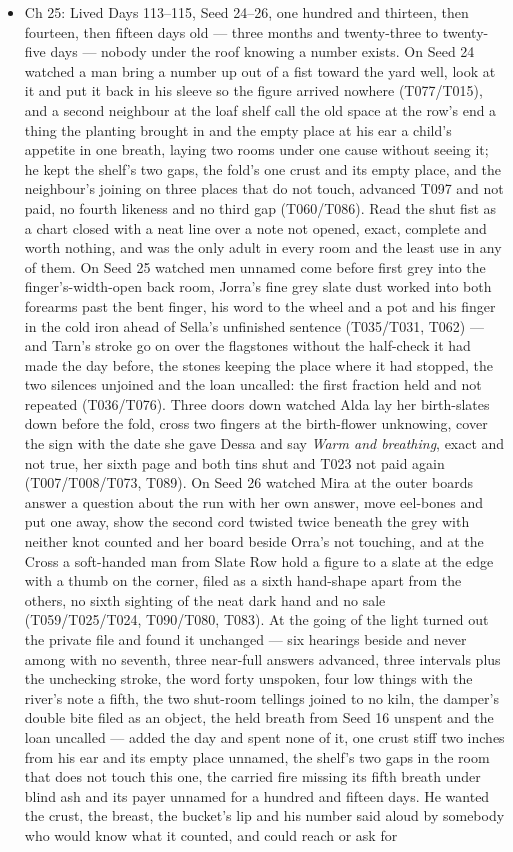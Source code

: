 \documentclass{design/chronicle}
\begin{document}
{\begin{itemize}[leftmargin=1.4em,itemsep=1pt,topsep=3pt,parsep=0pt]
\item Ch 25: Lived Days 113–115, Seed 24–26, one hundred and thirteen, then fourteen, then fifteen days old — three months and twenty-three to twenty-five days — nobody under the roof knowing a number exists. On Seed 24 watched a man bring a number up out of a fist toward the yard well, look at it and put it back in his sleeve so the figure arrived nowhere (T077/T015), and a second neighbour at the loaf shelf call the old space at the row’s end a thing the planting brought in and the empty place at his ear a child’s appetite in one breath, laying two rooms under one cause without seeing it; he kept the shelf’s two gaps, the fold’s one crust and its empty place, and the neighbour’s joining on three places that do not touch, advanced T097 and not paid, no fourth likeness and no third gap (T060/T086). Read the shut fist as a chart closed with a neat line over a note not opened, exact, complete and worth nothing, and was the only adult in every room and the least use in any of them. On Seed 25 watched men unnamed come before first grey into the finger’s-width-open back room, Jorra’s fine grey slate dust worked into both forearms past the bent finger, his word to the wheel and a pot and his finger in the cold iron ahead of Sella’s unfinished sentence (T035/T031, T062) — and Tarn’s stroke go on over the flagstones without the half-check it had made the day before, the stones keeping the place where it had stopped, the two silences unjoined and the loan uncalled: the first fraction held and not repeated (T036/T076). Three doors down watched Alda lay her birth-slates down before the fold, cross two fingers at the birth-flower unknowing, cover the sign with the date she gave Dessa and say \emph{Warm and breathing}, exact and not true, her sixth page and both tins shut and T023 not paid again (T007/T008/T073, T089). On Seed 26 watched Mira at the outer boards answer a question about the run with her own answer, move eel-bones and put one away, show the second cord twisted twice beneath the grey with neither knot counted and her board beside Orra’s not touching, and at the Cross a soft-handed man from Slate Row hold a figure to a slate at the edge with a thumb on the corner, filed as a sixth hand-shape apart from the others, no sixth sighting of the neat dark hand and no sale (T059/T025/T024, T090/T080, T083). At the going of the light turned out the private file and found it unchanged — six hearings beside and never among with no seventh, three near-full answers advanced, three intervals plus the unchecking stroke, the word forty unspoken, four low things with the river’s note a fifth, the two shut-room tellings joined to no kiln, the damper’s double bite filed as an object, the held breath from Seed 16 unspent and the loan uncalled — added the day and spent none of it, one crust stiff two inches from his ear and its empty place unnamed, the shelf’s two gaps in the room that does not touch this one, the carried fire missing its fifth breath under blind ash and its payer unnamed for a hundred and fifteen days. He wanted the crust, the breast, the bucket’s lip and his number said aloud by somebody who would know what it counted, and could reach or ask for 
\end{itemize}}
\end{document}
